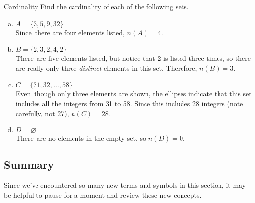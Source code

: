 \begin{example}[https://www.youtube.com/watch?v=Rh8ss4TBAdo]{Cardinality}
Find the cardinality of each of the following sets.

\begin{enumerate}[(a)]
\item $A = \{3, 5, 9, 32\}$\\

Since\sol\ there are four elements listed, $n(A) = 4$.\\

\item $B = \{2, 3, 2, 4, 2\}$\\

There\sol\ are five elements listed, but notice that 2 is listed three times, so there are really only three \emph{distinct} elements in this set.  Therefore, $n(B) = 3$.\\

\item $C = \{31, 32, \ldots, 58\}$\\

Even\sol\ though only three elements are shown, the ellipses indicate that this set includes all the integers from 31 to 58.  Since this includes 28 integers (note carefully, not 27), $n(C) = 28$.\\

\item $D = \varnothing$\\

There\sol\ are no elements in the empty set, so $n(D) = 0$.
\end{enumerate}
\end{example}
\pagebreak

\subsection{Summary}
Since we've encountered so many new terms and symbols in this section, it may be helpful to pause for a moment and review these new concepts.

